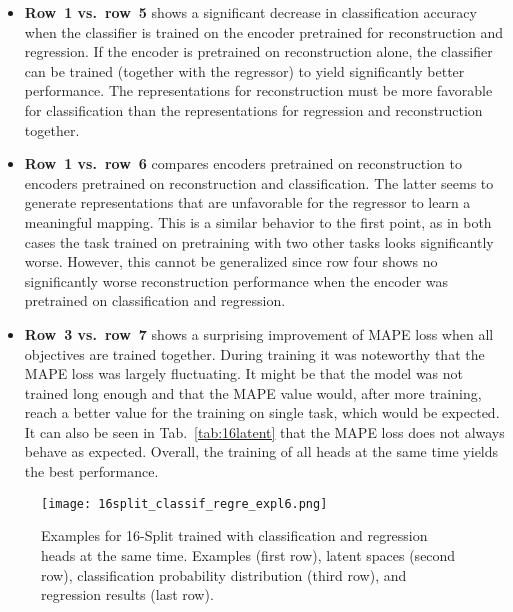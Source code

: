 \documentclass[../../main.tex]{subfiles}
\begin{document}
\begin{itemize}
	\item \textbf{Row~1 vs.~row~5} shows a significant decrease in classification accuracy when the classifier is trained on the encoder pretrained for reconstruction and regression. If the encoder is pretrained on reconstruction alone, the classifier can be trained (together with the regressor) to yield significantly better performance. The representations for reconstruction must be more favorable for classification than the representations for regression and reconstruction together.
	\item \textbf{Row~1 vs.~row~6} compares encoders pretrained on reconstruction to encoders pretrained on reconstruction and classification. The latter seems to generate representations that are unfavorable for the regressor to learn a meaningful mapping. This is a similar behavior to the first point, as in both cases the task trained on pretraining with two other tasks looks significantly worse. However, this cannot be generalized since row four shows no significantly worse reconstruction performance when the encoder was pretrained on classification and regression.
	\item \textbf{Row~3 vs.~row~7} shows a surprising improvement of MAPE loss when all objectives are trained together. During training it was noteworthy that the MAPE loss was largely fluctuating. It might be that the model was not trained long enough and that the MAPE value would, after more training, reach a better value for the training on single task, which would be expected. It can also be seen in Tab.~\ref{tab:16latent} that the MAPE loss does not always behave as expected. Overall, the training of all heads at the same time yields the best performance.
\end{itemize}
\begin{figure}[htp]
			\begin{center}
				\texttt{[image: 16split\_classif\_regre\_expl6.png]}
				\caption{Examples for 16-Split trained with classification and regression heads at the same time. Examples (first row), latent spaces (second row), classification probability distribution (third row), and regression results (last row).}
				\label{fig:16s_class_regr}
			\end{center}
\end{figure}
\end{document}
